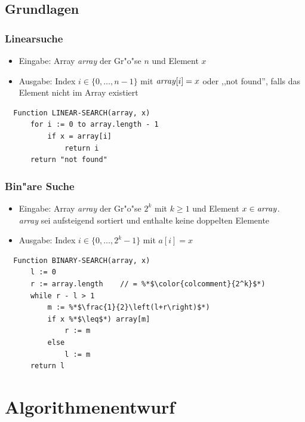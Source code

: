 \subsection{Grundlagen}
\begin{frame}[fragile]
  \frametitle{Linearsuche}
  \begin{itemize}
  \item Eingabe: Array \emph{array} der Gr"o"se $n$ und Element $x$
  \item Ausgabe: Index $i \in \{0,\ldots,n-1\}$ mit $\text{\emph{array}}[i] = x$
                 oder ,,not found'', falls das Element nicht im Array existiert
  \end{itemize}
  \begin{lstlisting}
  Function LINEAR-SEARCH(array, x)
      for i := 0 to array.length - 1
          if x = array[i]
              return i
      return "not found"
  \end{lstlisting}
\end{frame}

\begin{frame}[fragile]
  \frametitle{Bin"are Suche}
  \begin{itemize}
  \item Eingabe: Array \emph{array} der Gr"o"se $2^k$ mit $k \geq 1$ und Element
                 $x \in \text{\emph{array}}$. \\
                 \emph{array} sei aufsteigend sortiert und enthalte
                 keine doppelten Elemente
  \item Ausgabe: Index $i \in \{0,\ldots,2^k-1\}$ mit $a[i] = x$
  \end{itemize}
  \begin{lstlisting}
  Function BINARY-SEARCH(array, x)
      l := 0
      r := array.length    // = %*$\color{colcomment}{2^k}$*)
      while r - l > 1
          m := %*$\frac{1}{2}\left(l+r\right)$*)
          if x %*$\leq$*) array[m]
              r := m
          else
              l := m
      return l
  \end{lstlisting}
\end{frame}

\section{Algorithmenentwurf}
